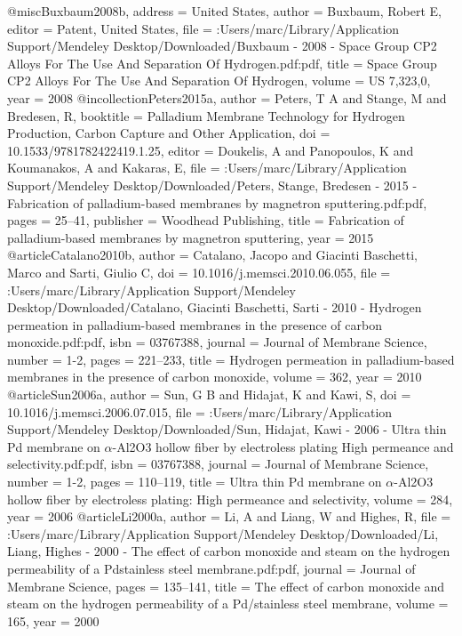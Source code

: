 @misc{Buxbaum2008b,
address = {United States},
author = {Buxbaum, Robert E},
editor = {Patent, United States},
file = {:Users/marc/Library/Application Support/Mendeley Desktop/Downloaded/Buxbaum - 2008 - Space Group CP2 Alloys For The Use And Separation Of Hydrogen.pdf:pdf},
title = {{Space Group CP2 Alloys For The Use And Separation Of Hydrogen}},
volume = {US 7,323,0},
year = {2008}
}
@incollection{Peters2015a,
author = {Peters, T A and Stange, M and Bredesen, R},
booktitle = {Palladium Membrane Technology for Hydrogen Production, Carbon Capture and Other Application},
doi = {10.1533/9781782422419.1.25},
editor = {Doukelis, A and Panopoulos, K and Koumanakos, A and Kakaras, E},
file = {:Users/marc/Library/Application Support/Mendeley Desktop/Downloaded/Peters, Stange, Bredesen - 2015 - Fabrication of palladium-based membranes by magnetron sputtering.pdf:pdf},
pages = {25--41},
publisher = {Woodhead Publishing},
title = {{Fabrication of palladium-based membranes by magnetron sputtering}},
year = {2015}
}
@article{Catalano2010b,
author = {Catalano, Jacopo and {Giacinti Baschetti}, Marco and Sarti, Giulio C},
doi = {10.1016/j.memsci.2010.06.055},
file = {:Users/marc/Library/Application Support/Mendeley Desktop/Downloaded/Catalano, Giacinti Baschetti, Sarti - 2010 - Hydrogen permeation in palladium-based membranes in the presence of carbon monoxide.pdf:pdf},
isbn = {03767388},
journal = {Journal of Membrane Science},
number = {1-2},
pages = {221--233},
title = {{Hydrogen permeation in palladium-based membranes in the presence of carbon monoxide}},
volume = {362},
year = {2010}
}
@article{Sun2006a,
author = {Sun, G B and Hidajat, K and Kawi, S},
doi = {10.1016/j.memsci.2006.07.015},
file = {:Users/marc/Library/Application Support/Mendeley Desktop/Downloaded/Sun, Hidajat, Kawi - 2006 - Ultra thin Pd membrane on $\alpha$-Al2O3 hollow fiber by electroless plating High permeance and selectivity.pdf:pdf},
isbn = {03767388},
journal = {Journal of Membrane Science},
number = {1-2},
pages = {110--119},
title = {{Ultra thin Pd membrane on $\alpha$-Al2O3 hollow fiber by electroless plating: High permeance and selectivity}},
volume = {284},
year = {2006}
}
@article{Li2000a,
author = {Li, A and Liang, W and Highes, R},
file = {:Users/marc/Library/Application Support/Mendeley Desktop/Downloaded/Li, Liang, Highes - 2000 - The effect of carbon monoxide and steam on the hydrogen permeability of a Pdstainless steel membrane.pdf:pdf},
journal = {Journal of Membrane Science},
pages = {135--141},
title = {{The effect of carbon monoxide and steam on the hydrogen permeability of a Pd/stainless steel membrane}},
volume = {165},
year = {2000}
}
